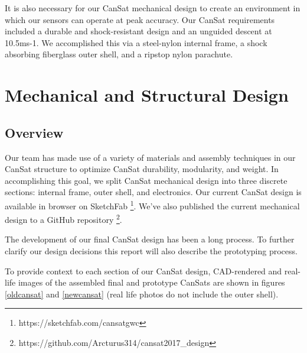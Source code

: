 \documentclass[]{report}
\begin{document}
It is also necessary for our CanSat mechanical design to create an environment in which our sensors can operate at peak accuracy. Our CanSat requirements included a durable and shock-resistant design and an unguided descent at 10.5ms-1. We accomplished this via a steel-nylon internal frame, a shock absorbing fiberglass outer shell, and a ripstop nylon parachute.
\section{Mechanical and Structural Design}
\subsection{Overview}
Our team has made use of a variety of materials and assembly techniques in our CanSat structure to optimize CanSat durability, modularity, and weight. In accomplishing this goal, we split CanSat mechanical design into three discrete sections: internal frame, outer shell, and electronics. Our current CanSat design is available in browser on SketchFab \footnote{https://sketchfab.com/cansatgwc}. We've also published the current mechanical design to a GitHub repository \footnote{https://github.com/Arcturus314/cansat2017\_design}.

The development of our final CanSat design has been a long process. To further clarify our design decisions this report will also describe the prototyping process.

To provide context to each section of our CanSat design, CAD-rendered and real-life images of the assembled final and prototype CanSats are shown in figures \ref{oldcansat} and \ref{newcansat} (real life photos do not include the outer shell).
\end{document}
